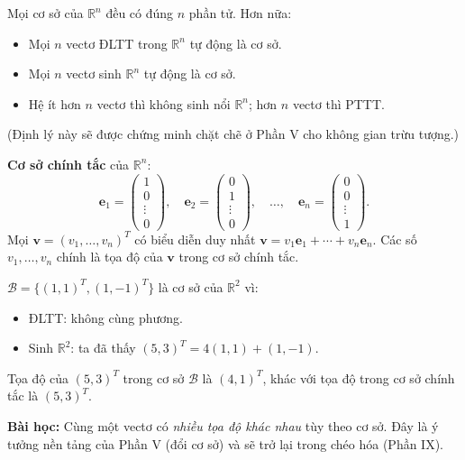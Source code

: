 \documentclass[12pt,a4paper]{article}
\begin{document}
\begin{dinhly}[title={Tính duy nhất của số chiều}]
Mọi cơ sở của $\mathbb{R}^n$ đều có đúng $n$ phần tử. Hơn nữa:
\begin{itemize}
  \item Mọi $n$ vectơ ĐLTT trong $\mathbb{R}^n$ tự động là cơ sở.
  \item Mọi $n$ vectơ sinh $\mathbb{R}^n$ tự động là cơ sở.
  \item Hệ ít hơn $n$ vectơ thì không sinh nổi $\mathbb{R}^n$; hơn $n$ vectơ thì PTTT.
\end{itemize}
(Định lý này sẽ được chứng minh chặt chẽ ở Phần V cho không gian trừu tượng.)
\end{dinhly}

\begin{vidu}[title={Cơ sở chính tắc}]
\textbf{Cơ sở chính tắc} của $\mathbb{R}^n$:
\[
  \mathbf{e}_1 = \begin{pmatrix}1\\0\\\vdots\\0\end{pmatrix},\quad
  \mathbf{e}_2 = \begin{pmatrix}0\\1\\\vdots\\0\end{pmatrix},\quad
  \ldots,\quad
  \mathbf{e}_n = \begin{pmatrix}0\\0\\\vdots\\1\end{pmatrix}.
\]
Mọi $\mathbf{v} = (v_1, \ldots, v_n)^T$ có biểu diễn duy nhất $\mathbf{v} = v_1\mathbf{e}_1 + \cdots + v_n\mathbf{e}_n$. Các số $v_1, \ldots, v_n$ chính là tọa độ của $\mathbf{v}$ trong cơ sở chính tắc.
\end{vidu}

\begin{vidu}[title={Cơ sở khác của $\mathbb{R}^2$}]
$\mathcal{B} = \{(1,1)^T, (1,-1)^T\}$ là cơ sở của $\mathbb{R}^2$ vì:
\begin{itemize}
  \item ĐLTT: không cùng phương.
  \item Sinh $\mathbb{R}^2$: ta đã thấy $(5,3)^T = 4(1,1) + (1,-1)$.
\end{itemize}
Tọa độ của $(5,3)^T$ trong cơ sở $\mathcal{B}$ là $(4, 1)^T$, khác với tọa độ trong cơ sở chính tắc là $(5,3)^T$.

\textbf{Bài học:} Cùng một vectơ có \emph{nhiều tọa độ khác nhau} tùy theo cơ sở. Đây là ý tưởng nền tảng của Phần V (đổi cơ sở) và sẽ trở lại trong chéo hóa (Phần IX).
\end{vidu}
\end{document}
